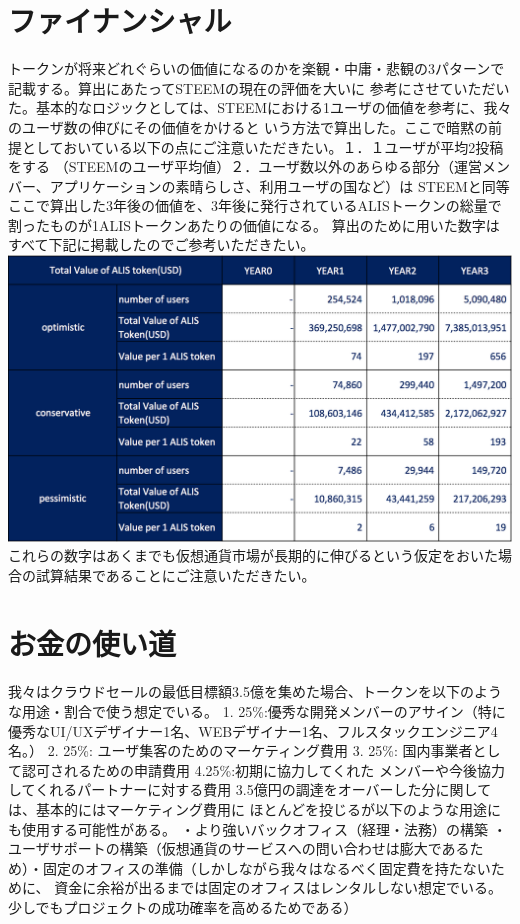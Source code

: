 \documentclass{jsarticle}
\begin{document}
\section{ファイナンシャル}
トークンが将来どれぐらいの価値になるのかを楽観・中庸・悲観の3パターンで記載する。算出にあたってSTEEMの現在の評価を大いに
参考にさせていただいた。基本的なロジックとしては、STEEMにおける1ユーザの価値を参考に、我々のユーザ数の伸びにその価値をかけると
いう方法で算出した。ここで暗黙の前提としておいている以下の点にご注意いただきたい。１．１ユーザが平均2投稿をする
（STEEMのユーザ平均値）２．ユーザ数以外のあらゆる部分（運営メンバー、アプリケーションの素晴らしさ、利用ユーザの国など）は
STEEMと同等 ここで算出した3年後の価値を、3年後に発行されているALISトークンの総量で割ったものが1ALISトークンあたりの価値になる。
算出のために用いた数字はすべて下記に掲載したのでご参考いただきたい。
	\includegraphics[scale=0.6]{img/financialtable.png}
これらの数字はあくまでも仮想通貨市場が長期的に伸びるという仮定をおいた場合の試算結果であることにご注意いただきたい。
\section{お金の使い道}
我々はクラウドセールの最低目標額3.5億を集めた場合、トークンを以下のような用途・割合で使う想定でいる。
1. 25\%:優秀な開発メンバーのアサイン（特に優秀なUI/UXデザイナー1名、WEBデザイナー1名、フルスタックエンジニア4名。）
2. 25\%: ユーザ集客のためのマーケティング費用 3. 25\%: 国内事業者として認可されるための申請費用 4.25\%:初期に協力してくれた
メンバーや今後協力してくれるパートナーに対する費用 3.5億円の調達をオーバーした分に関しては、基本的にはマーケティング費用に
ほとんどを投じるが以下のような用途にも使用する可能性がある。 ・より強いバックオフィス（経理・法務）の構築 
・ユーザサポートの構築（仮想通貨のサービスへの問い合わせは膨大であるため）・固定のオフィスの準備（しかしながら我々はなるべく固定費を持たないために、
資金に余裕が出るまでは固定のオフィスはレンタルしない想定でいる。少しでもプロジェクトの成功確率を高めるためである）
\end{document}
